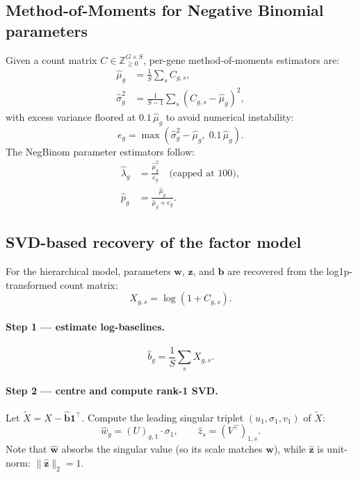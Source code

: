 \documentclass[11pt,a4paper]{article}
\theoremstyle{definition}
\begin{document}
\subsection{Method-of-Moments for Negative Binomial parameters}

Given a count matrix $C \in \mathbb{Z}_{\geq 0}^{G \times S}$, per-gene
method-of-moments estimators are:
\begin{align}
  \hat{\mu}_g &= \frac{1}{S}\sum_s C_{g,s}, \label{eq:mu_hat}\\
  \hat{\sigma}^2_g &= \frac{1}{S-1}\sum_s (C_{g,s} - \hat{\mu}_g)^2,
  \label{eq:sigma2_hat}
\end{align}
with excess variance floored at $0.1\,\hat{\mu}_g$ to avoid numerical
instability:
\begin{equation}
  e_g = \max\!\left(\hat{\sigma}^2_g - \hat{\mu}_g,\; 0.1\,\hat{\mu}_g\right).
  \label{eq:excess_var}
\end{equation}
The NegBinom parameter estimators follow:
\begin{align}
  \hat{\lambda}_g &= \frac{\hat{\mu}_g^2}{e_g}
    \quad \text{(capped at } 100\text{)},
  \label{eq:lambda_hat}\\
  \hat{p}_g &= \frac{\hat{\mu}_g}{\hat{\mu}_g + e_g}.
  \label{eq:p_hat}
\end{align}

\subsection{SVD-based recovery of the factor model}

For the hierarchical model, parameters $\bm{w}$, $\bm{z}$, and $\bm{b}$
are recovered from the log1p-transformed count matrix:
\begin{equation}
  X_{g,s} = \log(1 + C_{g,s}).
\end{equation}

\paragraph{Step 1 --- estimate log-baselines.}
\begin{equation}
  \hat{b}_g = \frac{1}{S}\sum_s X_{g,s}.
\end{equation}

\paragraph{Step 2 --- centre and compute rank-1 SVD.}
Let $\tilde{X} = X - \hat{\bm{b}}\bm{1}^\top$. Compute the leading
singular triplet $(u_1, \sigma_1, v_1)$ of $\tilde{X}$:
\begin{equation}
  \hat{w}_g = (U)_{g,1} \cdot \sigma_1, \qquad
  \hat{z}_s = (V^\top)_{1,s}.
  \label{eq:svd_recovery}
\end{equation}
Note that $\hat{\bm{w}}$ absorbs the singular value (so its scale
matches $\bm{w}$), while $\hat{\bm{z}}$ is unit-norm:
$\|\hat{\bm{z}}\|_2 = 1$.
\end{document}
